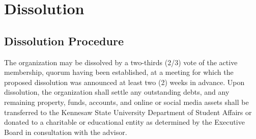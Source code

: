 \documentclass[12pt,letterpaper]{article} %
\begin{document}
\section{Dissolution}\label{art:dissolution}
\subsection{Dissolution Procedure}\label{sec:dissolution-procedure}
The organization may be dissolved by a two-thirds (2/3) vote of the active membership,
quorum having been established, at a meeting for which the proposed dissolution was
announced at least two (2) weeks in advance. Upon dissolution, the organization shall
settle any outstanding debts, and any remaining property, funds, accounts, and online
or social media assets shall be transferred to the Kennesaw State University Department
of Student Affairs or donated to a charitable or educational entity as determined by
the Executive Board in consultation with the advisor.
\end{document}

